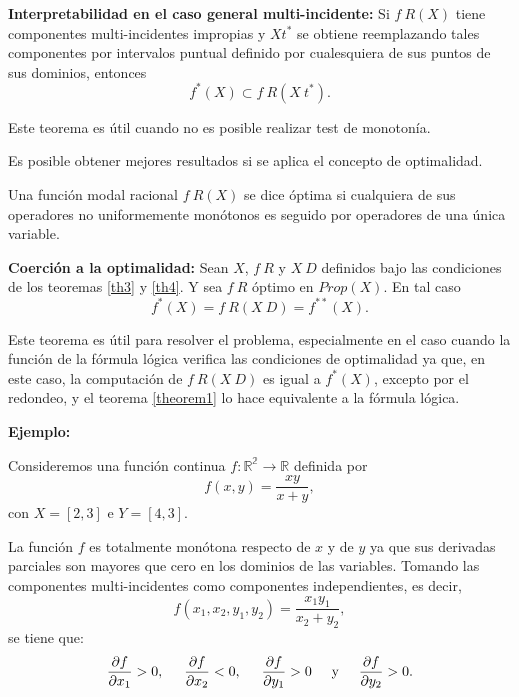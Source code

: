 \begin{theorem}{\textbf{Interpretabilidad en el caso general multi-incidente:}}\label{th5}
Si $f \ R(X)$ tiene componentes multi-incidentes impropias y $Xt^*$ se obtiene reemplazando tales componentes por intervalos puntual definido por cualesquiera de sus puntos  de sus dominios, entonces
$$f^*(X) \subset f \ R(X \ t^*).$$
\end{theorem}

Este teorema es útil cuando no es posible realizar test de monotonía.

Es posible obtener mejores resultados si se aplica el concepto de optimalidad.

\begin{definition}
Una función modal racional $f \ R(X)$ se dice óptima si cualquiera de sus operadores no uniformemente monótonos es seguido por operadores de una única variable.
\end{definition}

\begin{theorem}{\textbf{Coerción a la optimalidad:}}\label{th6}
Sean $X$, $f \ R$ y $X \ D$ definidos bajo las condiciones de los teoremas \ref{th3} y \ref{th4}. Y sea $f \ R$ óptimo en $Prop(X)$. En tal caso
$$f^*(X) = f \ R(X \ D) = f^{**}(X).$$
\end{theorem}

Este teorema es útil para resolver el problema, especialmente en el caso cuando la función de la fórmula lógica verifica las condiciones de optimalidad ya que, en este caso, la computación de $f \ R(X \ D)$ es igual a $f^*(X)$, excepto por el redondeo, y el teorema \ref{theorem1} lo hace equivalente a la fórmula lógica.

\textbf{Ejemplo:}

Consideremos una función continua $f : \mathbb{R^2} \to \mathbb{R}$ definida por
$$f(x,y) = \frac{xy}{x+y},$$
con $X = [2,3]$ e $Y = [4,3]$.

La función $f$ es totalmente monótona respecto de $x$ y de $y$ ya que sus derivadas parciales son mayores que cero en los dominios de las variables. Tomando las componentes multi-incidentes como componentes independientes, es decir,
$$f(x_1,x_2,y_1,y_2) = \frac{x_1 y_1}{x_2 + y_2},$$
se tiene que:
$$\frac{\partial f}{\partial x_1} > 0, \hspace{0.5cm} \frac{\partial f}{\partial x_2} < 0, \hspace{0.5cm} \frac{\partial f}{\partial y_1} > 0 \hspace{0.5cm} \text{y} \hspace{0.5cm} \frac{\partial f}{\partial y_2} > 0.$$

